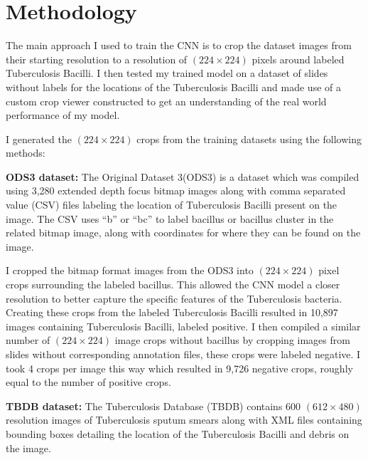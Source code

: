 \documentclass{article}
\begin{document}



\section{Methodology}

The main approach I used to train the CNN is to crop the dataset images from their starting resolution to a resolution
of $(224 \times 224)$ pixels around labeled Tuberculosis Bacilli. I then tested my trained model on a dataset of slides without
labels for the locations of the Tuberculosis Bacilli and made use of a custom crop viewer constructed to get an understanding of the
real world performance of my model.

I generated the $(224 \times 224)$ crops from the  training datasets using the following methods:

\textbf{ODS3 dataset:}
The Original Dataset 3(ODS3)\cite{Costa2025} is a dataset which was compiled using 3,280 extended depth focus bitmap images along with comma separated value (CSV)
files labeling the location of Tuberculosis Bacilli present on the image. The CSV uses ``b'' or ``bc'' to label bacillus
or bacillus cluster in the related bitmap image, along with coordinates for where they can be found on the image.

I cropped the bitmap format images from the ODS3 into $(224 \times 224)$ pixel crops surrounding the labeled bacillus. 
This allowed the CNN model a closer resolution to better capture the specific features of the Tuberculosis bacteria. 
Creating these crops from the labeled Tuberculosis Bacilli resulted in 10,897 images containing Tuberculosis Bacilli, labeled positive. 
I then compiled a similar number of $(224 \times 224)$ image crops without bacillus by cropping images from slides without corresponding annotation files,
these crops were labeled negative. I took 4 crops per image this way which resulted in 9,726 negative crops, roughly equal to the number of positive crops.


\textbf{TBDB dataset:}
The Tuberculosis Database (TBDB)\cite{TBDB} contains 600 $(612 \times 480)$ resolution images of Tuberculosis sputum smears along with
XML files containing bounding boxes detailing the location of the Tuberculosis Bacilli and debris on the image. 
\end{document}
